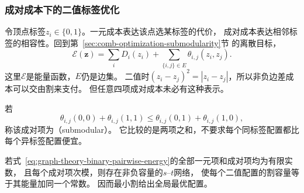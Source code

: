 \subsubsection{成对成本下的二值标签优化}

令顶点标签\(z_i\in\{0,1\}\)。一元成本表达该点选某标签的代价，
成对成本表达相邻标签的相容性。回到第~\ref{sec:comb-optimization-submodularity}节
的离散目标，
\begin{equation}
  \mathcal E(\bm z)=\sum_iD_i(z_i)
  +\sum_{\{i,j\}\in E}\theta_{i,j}(z_i,z_j).
  \label{eq:graph-theory-binary-pairwise-energy}
\end{equation}
这里\(\mathcal E\)是能量函数，\(E\)仍是边集。
二值时\((z_i-z_j)^2=|z_i-z_j|\)，所以非负边差成本可以交由割来支付。
但任意四项成对成本未必有这种表示。

若
\begin{equation}
  \theta_{i,j}(0,0)+\theta_{i,j}(1,1)
  \leq\theta_{i,j}(0,1)+\theta_{i,j}(1,0),
  \label{eq:graph-theory-pairwise-submodularity}
\end{equation}
称该成对项为（submodular）。
它比较的是两项之和，不要求每个同标签配置都比每个异标签配置便宜。

\begin{theorem}[二值次模成对能量的割表示]
  \label{thm:graph-theory-submodular-cut-representation}
  若式~\eqref{eq:graph-theory-binary-pairwise-energy}的全部一元项和成对项均为有限实数，
  且每个成对项次模，则存在非负容量的\(s\)--\(t\)网络，
  使每个二值配置的割容量等于其能量加同一个常数。
  因而最小割给出全局最优配置。
\end{theorem}

